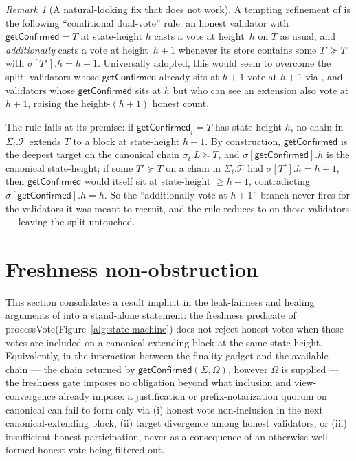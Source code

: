 \documentclass{article}
\newcommand{\T}[0]{\ensuremath{\mathcal{T}}}
\newcommand{\processVote}{\textsf{processVote}\xspace}
\newcommand{\getConfirmed}{\textsf{getConfirmed}\xspace}
\theoremstyle{plain}
\theoremstyle{definition}
\theoremstyle{remark}
\newtheorem{remark}[theorem]{Remark}
\begin{document}
\begin{remark}[A natural-looking fix that does not work]\label{rev:rem:conditional-dual-vote-fails}
A tempting refinement of  is the following ``conditional dual-vote'' rule: an honest validator with $\getConfirmed = T$ at state-height $h$ casts a vote at height~$h$ on $T$ as usual, and \emph{additionally} casts a vote at height~$h+1$ whenever its store contains some $T' \succeq T$ with $\sigma[T'].h = h+1$. Universally adopted, this would seem to overcome the split: validators whose $\getConfirmed$ already sits at $h+1$ vote at $h+1$ via , and validators whose $\getConfirmed$ sits at $h$ but who can see an extension also vote at $h+1$, raising the height-$(h+1)$ honest count.

The rule fails at its premise: if $\getConfirmed_i = T$ has state-height $h$, no chain in $\Sigma_i.\T$ extends $T$ to a block at state-height $h+1$. By construction, $\getConfirmed$ is the deepest target on the canonical chain $\sigma_i.L \succeq T$, and $\sigma[\getConfirmed].h$ is the canonical state-height; if some $T' \succeq T$ on a chain in $\Sigma_i.\T$ had $\sigma[T'].h = h+1$, then $\getConfirmed$ would itself sit at state-height $\geq h+1$, contradicting $\sigma[\getConfirmed].h = h$. So the ``additionally vote at $h+1$'' branch never fires for the validators it was meant to recruit, and the rule reduces to  on those validators --- leaving the split untouched.
\end{remark}


\section{Freshness non-obstruction}\label{sec:freshness-non-obstruction}

This section consolidates a result implicit in the leak-fairness and healing arguments of  into a stand-alone statement: the freshness predicate of \processVote (Figure~\ref{alg:state-machine}) does not reject honest votes when those votes are included on a canonical-extending block at the same state-height.
Equivalently, in the interaction between the finality gadget and the available chain --- the chain returned by $\getConfirmed(\Sigma, \Omega)$, however $\Omega$ is supplied --- the freshness gate imposes no obligation beyond what inclusion and view-convergence already impose: a justification or prefix-notarization quorum on canonical can fail to form only via (i) honest vote non-inclusion in the next canonical-extending block, (ii) target divergence among honest validators, or (iii) insufficient honest participation, never as a consequence of an otherwise well-formed honest vote being filtered out.
\end{document}
